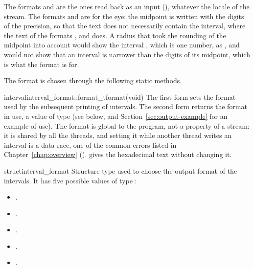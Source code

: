 \begin{Rem}
The formats  and  are the ones read back as
an input (), whatever the locale of the stream. The
formats  and  are for the eye: the midpoint
is written with the digits of the precision, so that the text
 does not necessarily contain the interval, where the text
of the formats ,  and  does.
A radius that took the rounding of the midpoint into account would show the
interval , which is one number, as , and
would not show that an interval is narrower than the digits of its
midpoint, which is what the format is for.
\end{Rem}

\medskip
The format is chosen through the following static methods.

\begin{defstaticmethod}{interval}{interval\_format::format\_t}{format}{(void)}
  The first form sets the format used by the subsequent printing of
  intervals. The second form returns the format in use, a value of type
   (see below, and
  Section~\ref{sec:output-example} for an example of use). The format is
  global to the program, not a property of a stream: it is shared by all the
  threads, and setting it while another thread writes an interval is a data
  race, one of the common errors listed in Chapter~\ref{chap:overview}
  ().
   gives the hexadecimal text without changing it.
\end{defstaticmethod}

\begin{deftype}{struct}{interval\_format}
  Structure type used to choose the output format of the intervals. It has
  five possible values of type :
\begin{itemize}
\item {}.
\item {}.
\item {}.
\item {}.
\item {}.
\end{itemize}
\end{deftype}

